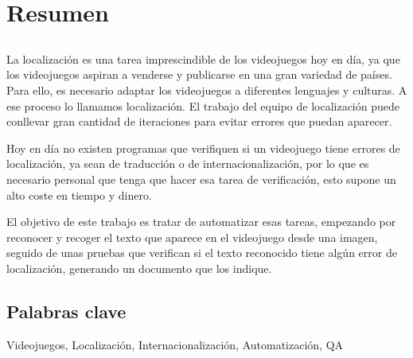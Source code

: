 \chapter*{Resumen}

\section*{\tituloPortadaVal}

La localización es una tarea imprescindible de los videojuegos hoy en día, ya que los videojuegos aspiran a venderse y publicarse en una gran variedad de países. 
Para ello, es necesario adaptar los videojuegos a diferentes lenguajes y culturas. A ese proceso lo llamamos localización. El trabajo del equipo de localización puede conllevar gran cantidad de iteraciones para evitar errores que puedan aparecer.

Hoy en día no existen programas que verifiquen si un videojuego tiene errores de localización, ya sean de traducción o de internacionalización, por lo que es necesario personal que tenga que hacer esa tarea de verificación, esto supone un alto coste en tiempo y dinero.

El objetivo de este trabajo es tratar de automatizar esas tareas, empezando por reconocer y recoger el texto que aparece en el videojuego desde una imagen, seguido de unas pruebas que verifican si el texto reconocido tiene algún error de localización, generando un documento que los indique.


\section*{Palabras clave}
   
\noindent Videojuegos, Localización, Internacionalización, Automatización, QA

   


